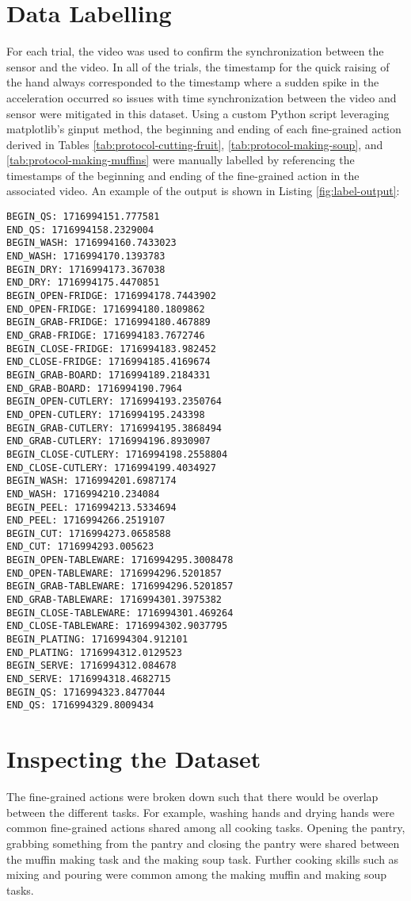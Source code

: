 \section{Data Labelling}
For each trial, the video was used to confirm the synchronization between the sensor and the video. In all of the trials, the timestamp for the quick raising of the hand always corresponded to the timestamp where a sudden spike in the acceleration occurred so issues with time synchronization between the video and sensor were mitigated in this dataset. Using a custom Python script leveraging matplotlib's ginput method, the beginning and ending of each fine-grained action derived in Tables \ref{tab:protocol-cutting-fruit}, \ref{tab:protocol-making-soup}, and \ref{tab:protocol-making-muffins} were manually labelled by referencing the timestamps of the beginning and ending of the fine-grained action in the associated video. An example of the output is shown in Listing \ref{fig:label-output}:


\begin{lstlisting}[label=fig:label-output, caption=Manual labelling output for the cutting fruit task.]
BEGIN_QS: 1716994151.777581
END_QS: 1716994158.2329004
BEGIN_WASH: 1716994160.7433023
END_WASH: 1716994170.1393783
BEGIN_DRY: 1716994173.367038
END_DRY: 1716994175.4470851
BEGIN_OPEN-FRIDGE: 1716994178.7443902
END_OPEN-FRIDGE: 1716994180.1809862
BEGIN_GRAB-FRIDGE: 1716994180.467889
END_GRAB-FRIDGE: 1716994183.7672746
BEGIN_CLOSE-FRIDGE: 1716994183.982452
END_CLOSE-FRIDGE: 1716994185.4169674
BEGIN_GRAB-BOARD: 1716994189.2184331
END_GRAB-BOARD: 1716994190.7964
BEGIN_OPEN-CUTLERY: 1716994193.2350764
END_OPEN-CUTLERY: 1716994195.243398
BEGIN_GRAB-CUTLERY: 1716994195.3868494
END_GRAB-CUTLERY: 1716994196.8930907
BEGIN_CLOSE-CUTLERY: 1716994198.2558804
END_CLOSE-CUTLERY: 1716994199.4034927
BEGIN_WASH: 1716994201.6987174
END_WASH: 1716994210.234084
BEGIN_PEEL: 1716994213.5334694
END_PEEL: 1716994266.2519107
BEGIN_CUT: 1716994273.0658588
END_CUT: 1716994293.005623
BEGIN_OPEN-TABLEWARE: 1716994295.3008478
END_OPEN-TABLEWARE: 1716994296.5201857
BEGIN_GRAB-TABLEWARE: 1716994296.5201857
END_GRAB-TABLEWARE: 1716994301.3975382
BEGIN_CLOSE-TABLEWARE: 1716994301.469264
END_CLOSE-TABLEWARE: 1716994302.9037795
BEGIN_PLATING: 1716994304.912101
END_PLATING: 1716994312.0129523
BEGIN_SERVE: 1716994312.084678
END_SERVE: 1716994318.4682715
BEGIN_QS: 1716994323.8477044
END_QS: 1716994329.8009434
\end{lstlisting}

\clearpage
\section{Inspecting the Dataset}
The fine-grained actions were broken down such that there would be overlap between the different tasks. For example, washing hands and drying hands were common fine-grained actions shared among all cooking tasks. Opening the pantry, grabbing something from the pantry and closing the pantry were shared between the muffin making task and the making soup task. Further cooking skills such as mixing and pouring were common among the making muffin and making soup tasks. 

